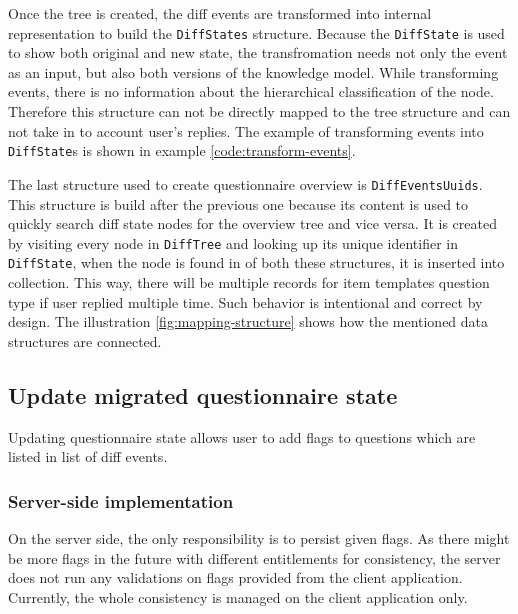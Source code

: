 Once the tree is created, the diff events are transformed into internal representation to build the \texttt{DiffStates} structure.
Because the \texttt{DiffState} is used to show both original and new state, the transfromation needs not only the event as an input, but also both versions of the knowledge model.
While transforming events, there is no information about the hierarchical classification of the node.
Therefore this structure can not be directly mapped to the tree structure and can not take in to account user's replies.
The example of transforming events into \texttt{DiffState}s is shown in example \ref{code:transform-events}.


The last structure used to create questionnaire overview is \texttt{DiffEventsUuids}.
This structure is build after the previous one because its content is used to quickly search diff state nodes for the overview tree and vice versa.
It is created by visiting every node in \texttt{DiffTree} and looking up its unique identifier in \texttt{DiffState}, when the node is found in of both these structures, it is inserted into collection.
This way, there will be multiple records for item templates question type if user replied multiple time.
Such behavior is intentional and correct by design.
The illustration \ref{fig:mapping-structure} shows how the mentioned data structures are connected.


\subsection{Update migrated questionnaire state}

Updating questionnaire state allows user to add flags to questions which are listed in list of diff events.

\subsubsection*{Server-side implementation}

On the server side, the only responsibility is to persist given flags.
As there might be more flags in the future with different entitlements for consistency, the server does not run any validations on flags provided from the client application.
Currently, the whole consistency is managed on the client application only.

